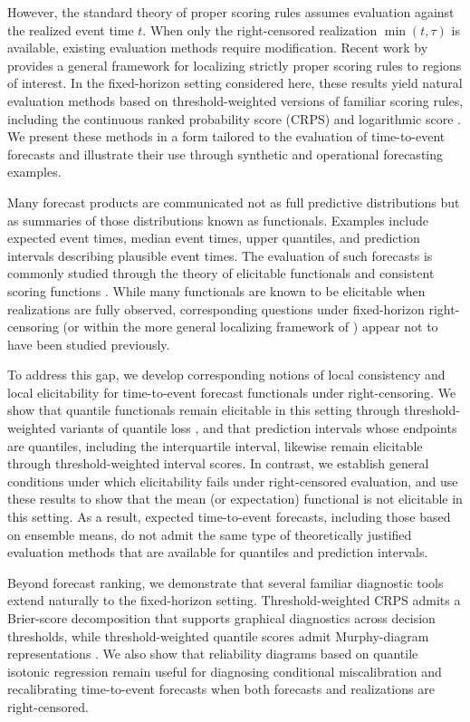 \documentclass[10pt]{article} %
\theoremstyle{theorem}
\theoremstyle{definition}
\begin{document}
However, the standard theory of proper scoring rules assumes evaluation against the realized event time $t$. When only the right-censored realization $\min(t,\tau)$ is available, existing evaluation methods require modification. Recent work by \citet{de2025localizing} provides a general framework for localizing strictly proper scoring rules to regions of interest. In the fixed-horizon setting considered here, these results yield natural evaluation methods based on threshold-weighted versions of familiar scoring rules, including the continuous ranked probability score (CRPS) and logarithmic score \citep{gneiting2011comparing, diks2011likelihood}. We present these methods in a form tailored to the evaluation of time-to-event forecasts and illustrate their use through synthetic and operational forecasting examples.

Many forecast products are communicated not as full predictive distributions but as summaries of those distributions known as functionals. Examples include expected event times, median event times, upper quantiles, and prediction intervals describing plausible event times. The evaluation of such forecasts is commonly studied through the theory of elicitable functionals and consistent scoring functions \citep{gneiting2011making, lambert2008eliciting}. While many functionals are known to be elicitable when realizations are fully observed, corresponding questions under fixed-horizon right-censoring (or within the more general localizing framework of \citealt{de2025localizing}) appear not to have been studied previously.

To address this gap, we develop corresponding notions of local consistency and local elicitability for time-to-event forecast functionals under right-censoring. We show that quantile functionals remain elicitable in this setting through threshold-weighted variants of quantile loss \citep{taggart2022point}, and that prediction intervals whose endpoints are quantiles, including the interquartile interval, likewise remain elicitable through threshold-weighted interval scores. In contrast, we establish general conditions under which elicitability fails under right-censored evaluation, and use these results to show that the mean (or  expectation) functional is not elicitable in this setting. As a result, expected time-to-event forecasts, including those based on ensemble means, do not admit the same type of theoretically justified evaluation methods that are available for quantiles and prediction intervals.

Beyond forecast ranking, we demonstrate that several familiar diagnostic tools extend naturally to the fixed-horizon setting. Threshold-weighted CRPS admits a Brier-score decomposition  \citep{schumacher2003assess} that supports graphical diagnostics across decision thresholds, while threshold-weighted quantile scores admit Murphy-diagram representations \citep{ehm2016quantiles}. We also show that reliability diagrams based on quantile isotonic regression \citep{gneiting2023regression} remain useful for diagnosing conditional miscalibration and recalibrating time-to-event forecasts when both forecasts and realizations are right-censored.
\end{document}
